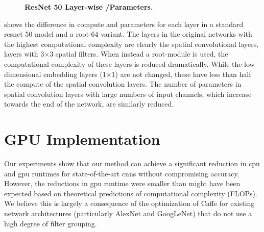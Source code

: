 \documentclass[thesis]{subfiles}
\begin{document}
{\begin{landscape}
\begin{figure}[tbp]
\begin{subfigure}[b]{0.97\linewidth}
			
		\end{subfigure}
		\caption[ResNet 50 layer-wise /parameters]{\textbf{ResNet 50 Layer-wise /Parameters.} 
		}
		
		\label{fig:resnet50layerwisema}
	\end{figure}
	\end{landscape}
	}
	 shows the difference in compute and parameters for each layer in a standard \gls{resnet} 50 model and a root-64 variant. The layers in the original networks with the highest computational complexity are clearly the spatial convolutional layers, \ie layers with 3$\times$3 spatial filters. When instead a root-module is used, the computational complexity of these layers is reduced dramatically. While the low dimensional embedding layers (1$\times$1) are not changed, these have less than half the compute of the spatial convolution layers. The number of parameters in spatial convolution layers with large numbers of input channels, which increase towards the end of the network, are similarly reduced.
	
	\section{GPU Implementation}\label{gpuexplanation}
	Our experiments show that our method can achieve a significant reduction in \gls{cpu} and \gls{gpu} runtimes for state-of-the-art \glspl{cnn} without compromising accuracy. However, the reductions in \gls{gpu} runtime were smaller than might have been expected based on theoretical predictions of computational complexity (FLOPs). We believe this is largely a consequence of the optimization of Caffe for existing network architectures (particularly AlexNet and GoogLeNet) that do not use a high degree of filter grouping.
	
\end{document}
